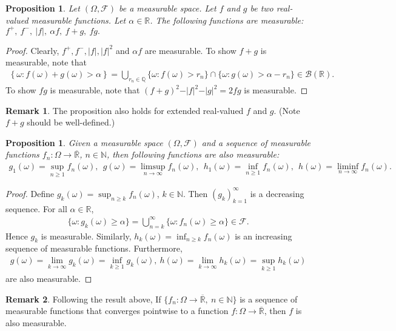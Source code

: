 \documentclass{article}
\numberwithin{equation}{section}
\theoremstyle{plain}
\newtheorem{proposition}[theorem]{Proposition}
\theoremstyle{definition}
\newtheorem*{remark}{Remark}
\begin{document}
\begin{proposition}\label{prop:1.33} Let $(\Omega,\mathscr{F})$ be a measurable space. Let $f$ and $g$ be two real-valued measurable functions. Let $\alpha\in\mathbb{R}$. The following functions are measurable: $f^+,\ f^-,\ \vert f\vert,\ \alpha f,\ f+g,\ fg.$
\end{proposition}
\begin{proof}
Clearly, $f^+,f^-,\vert f\vert,\vert f\vert^2$ and $\alpha f$ are measurable. To show $f+g$ is measurable, note that
\begin{align*}
	\left\{\omega:f(\omega)+g(\omega)>\alpha\right\} = \bigcup_{r_n\in\mathbb{Q}}\{\omega:f(\omega)>r_n\}\cap\{\omega:g(\omega)>\alpha - r_n\}\in\mathscr{B}(\mathbb{R}).
\end{align*}
To show $fg$ is measurable, note that $(f+g)^2 - \vert f\vert^2 - \vert g\vert^2=2fg$ is measurable.
\end{proof}
\begin{remark}
	The proposition also holds for extended real-valued $f$ and $g$. (Note $f+g$ should be well-defined.)
\end{remark}

\begin{proposition}\label{prop:1.34} Given a measurable space $(\Omega,\mathscr{F})$ and a sequence of measurable functions $f_n:\Omega\to\overline{\mathbb{R}}$, $n\in\mathbb{N}$, then following functions are also measurable:
\begin{align*}
	g_1(\omega)=\sup_{n\geq 1}f_n(\omega),\ \ g(\omega)=\limsup_{n\to \infty}f_n(\omega),\ \ h_1(\omega)=\inf_{n\geq 1}f_n(\omega),\ \ h(\omega)=\liminf_{n\to \infty}f_n(\omega).
\end{align*}
\end{proposition}
\begin{proof}
Define $g_k(\omega)=\sup_{n\geq k}f_n(\omega)$, $k\in\mathbb{N}$. Then $(g_k)_{k=1}^\infty$ is a decreasing sequence. For all $\alpha\in\mathbb{R}$,
\begin{align*}
	\{\omega:g_k(\omega)\geq\alpha\} = \bigcup_{n=k}^\infty\{\omega:f_n(\omega)\geq\alpha\}\in\mathscr{F}.
\end{align*}
Hence $g_k$ is measurable. Similarly, $h_k(\omega)=\inf_{n\geq k}f_n(\omega)$ is an increasing sequence of measurable functions. Furthermore,
\begin{align*}
	g(\omega) = \lim_{k\to\infty} g_k(\omega) = \inf_{k\geq 1} g_k(\omega),\ h(\omega) = \lim_{k\to\infty} h_k(\omega) = \sup_{k\geq 1} h_k(\omega)
\end{align*}
are also measurable.
\end{proof}
\begin{remark}
	Following the result above, If $\{f_n:\Omega\to\overline{\mathbb{R}},\ n\in\mathbb{N}\}$ is a sequence of measurable functions that converges pointwise to a function $f:\Omega\to\overline{\mathbb{R}}$, then $f$ is also measurable.
\end{remark}
\end{document}
